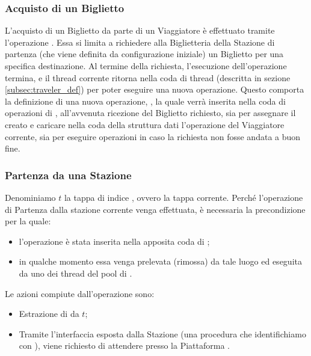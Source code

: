 	\subsubsection{Acquisto di un Biglietto}\label{subsubsec:buy_ticket}
	
	L'acquisto di un Biglietto da parte di un Viaggiatore è effettuato tramite l'operazione . Essa si limita a richiedere alla Biglietteria della Stazione di partenza (che viene definita da configurazione iniziale) un Biglietto per una specifica destinazione. Al termine della richiesta, l'esecuzione dell'operazione termina, e il thread corrente ritorna nella coda di thread  (descritta in sezione \ref{subsec:traveler_def}) per poter eseguire una nuova operazione. Questo comporta la definizione di una nuova operazione, , la quale verrà inserita nella coda di operazioni di , all'avvenuta ricezione del Biglietto richiesto, sia per assegnare il  creato e caricare nella coda della struttura dati  l'operazione  del Viaggiatore corrente, sia per eseguire operazioni in caso la richiesta non fosse andata a buon fine.
	
	\subsubsection{Partenza da una Stazione}
	
	Denominiamo $t$ la tappa di indice , ovvero la tappa corrente. Perché l'operazione di Partenza dalla stazione corrente venga effettuata, è necessaria la precondizione per la quale:
	\begin{itemize}
		\item l'operazione  è stata inserita nella apposita coda di ;
		\item in qualche momento essa venga prelevata (rimossa) da tale luogo ed eseguita da uno dei thread del pool di . 
	\end{itemize}
Le azioni compiute dall'operazione  sono:
	
	\begin{itemize}
		\item Estrazione di  da $t$;
		\item Tramite l'interfaccia esposta dalla Stazione  (una procedura che identifichiamo con ), viene richiesto di attendere presso la Piattaforma .
	\end{itemize} 
	
